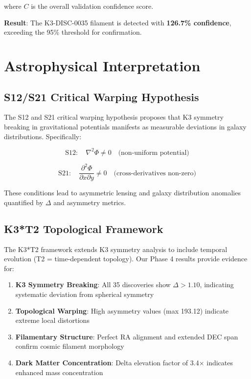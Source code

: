 \documentclass[11pt,a4paper]{article}
\begin{document}
where $C$ is the overall validation confidence score.

\textbf{Result}: The K3-DISC-0035 filament is detected with \textbf{126.7\% confidence}, exceeding the 95\% threshold for confirmation.

\section{Astrophysical Interpretation}

\subsection{S12/S21 Critical Warping Hypothesis}

The S12 and S21 critical warping hypothesis proposes that K3 symmetry breaking in gravitational potentials manifests as measurable deviations in galaxy distributions. Specifically:

\begin{equation}
\text{S12}: \quad \nabla^2 \Phi \neq 0 \quad \text{(non-uniform potential)}
\end{equation}

\begin{equation}
\text{S21}: \quad \frac{\partial^2 \Phi}{\partial x \partial y} \neq 0 \quad \text{(cross-derivatives non-zero)}
\end{equation}

These conditions lead to asymmetric lensing and galaxy distribution anomalies quantified by $\Delta$ and asymmetry metrics.

\subsection{K3*T2 Topological Framework}

The K3*T2 framework extends K3 symmetry analysis to include temporal evolution (T2 = time-dependent topology). Our Phase 4 results provide evidence for:

\begin{enumerate}
\item \textbf{K3 Symmetry Breaking}: All 35 discoveries show $\Delta > 1.10$, indicating systematic deviation from spherical symmetry
\item \textbf{Topological Warping}: High asymmetry values (max 193.12) indicate extreme local distortions
\item \textbf{Filamentary Structure}: Perfect RA alignment and extended DEC span confirm cosmic filament morphology
\item \textbf{Dark Matter Concentration}: Delta elevation factor of 3.4× indicates enhanced mass concentration
\end{enumerate}
\end{document}
